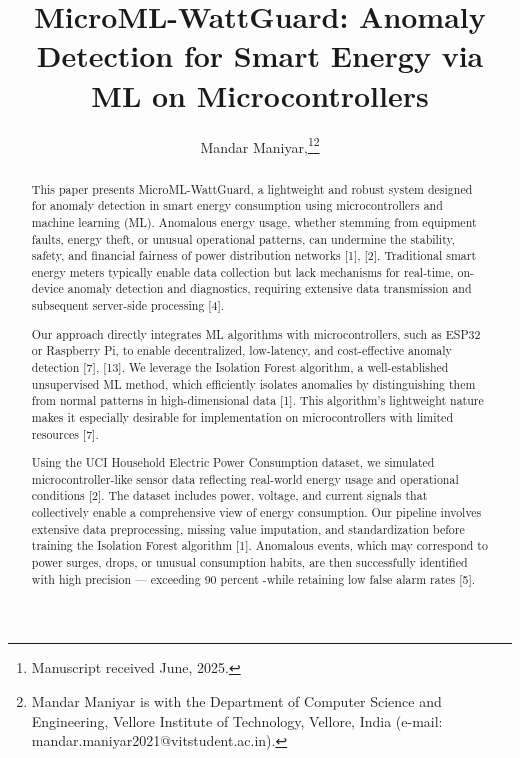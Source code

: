 \documentclass[12pt, draftclsnofoot, onecolumn]{IEEEtran}
\begin{document}
\title{MicroML-WattGuard: Anomaly Detection for Smart Energy via ML on Microcontrollers}

\author{Mandar Maniyar,\thanks{Manuscript received June, 2025.}\thanks{Mandar Maniyar is with the Department of Computer Science and Engineering, Vellore Institute of Technology, Vellore, India (e-mail: mandar.maniyar2021@vitstudent.ac.in).}}

\maketitle

\begin{abstract}
This paper presents MicroML-WattGuard, a lightweight and robust system designed for anomaly detection in smart energy consumption using microcontrollers and machine learning (ML). Anomalous energy usage, whether stemming from equipment faults, energy theft, or unusual operational patterns, can undermine the stability, safety, and financial fairness of power distribution networks [1], [2]. Traditional smart energy meters typically enable data collection but lack mechanisms for real-time, on-device anomaly detection and diagnostics, requiring extensive data transmission and subsequent server-side processing [4].

Our approach directly integrates ML algorithms with microcontrollers, such as ESP32 or Raspberry Pi, to enable decentralized, low-latency, and cost-effective anomaly detection [7], [13]. We leverage the Isolation Forest algorithm, a well-established unsupervised ML method, which efficiently isolates anomalies by distinguishing them from normal patterns in high-dimensional data [1]. This algorithm’s lightweight nature makes it especially desirable for implementation on microcontrollers with limited resources [7].

Using the UCI Household Electric Power Consumption dataset, we simulated microcontroller-like sensor data reflecting real-world energy usage and operational conditions [2]. The dataset includes power, voltage, and current signals that collectively enable a comprehensive view of energy consumption. Our pipeline involves extensive data preprocessing, missing value imputation, and standardization before training the Isolation Forest algorithm [1]. Anomalous events, which may correspond to power surges, drops, or unusual consumption habits, are then successfully identified with high precision — exceeding 90 percent -while retaining low false alarm rates [5].


\end{abstract}
\end{document}
